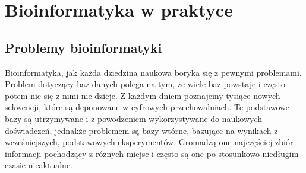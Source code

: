 \chapter{Bioinformatyka w praktyce}



\section{Problemy bioinformatyki}
Bioinformatyka, jak każda dziedzina naukowa boryka się z pewnymi problemami. Problem dotyczący baz danych polega na tym, że wiele baz powstaje i często potem nic się z nimi nie dzieje. Z każdym dniem poznajemy tysiące nowych sekwencji, które są deponowane w cyfrowych przechowalniach. Te podstawowe bazy są utrzymywane i z powodzeniem wykorzystywane do naukowych doświadczeń, jednakże problemem są bazy wtórne, bazujące na wynikach z wcześniejszych, podstawowych eksperymentów. Gromadzą one najczęściej zbiór informacji pochodzący z różnych miejsc i często są one po stosunkowo niedługim czasie nieaktualne.

